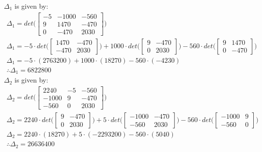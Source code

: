 \documentclass[letterpaper]{article}
\begin{document}
$\Delta_1$ is given by:
    \begin{gather*}
        \Delta_1 = det\Bigg(
        \begin{bmatrix}
            -5 & -1000 & -560\\
            9 & 1470 & -470\\
            0 & -470 & 2030
        \end{bmatrix}
        \Bigg)\\
        \Delta_1 = -5\cdot det\bigg(
        \begin{bmatrix}
            1470 & -470\\
            -470 & 2030
        \end{bmatrix}
        \bigg)
        +1000\cdot det\bigg(
        \begin{bmatrix}
            9 & -470\\
            0 & 2030
        \end{bmatrix}
        \bigg)
        -560\cdot det\bigg(
        \begin{bmatrix}
            9 & 1470\\
            0 & -470
        \end{bmatrix}
        \bigg)\\
        \Delta_1 = -5\cdot(2763200)+1000\cdot(18270)-560\cdot(-4230)\\
        \therefore\Delta_1 = 6822800
    \end{gather*}
$\Delta_2$ is given by:
    \begin{gather*}
        \Delta_2 = det\Bigg(
        \begin{bmatrix}
            2240 & -5 & -560\\
            -1000 & 9 & -470\\
            -560 & 0 & 2030
        \end{bmatrix}
        \Bigg)\\
        \Delta_2 = 2240\cdot det\bigg(
        \begin{bmatrix}
            9 & -470\\
            0 & 2030
        \end{bmatrix}
        \bigg)
        +5\cdot det\bigg(
        \begin{bmatrix}
            -1000 & -470\\
            -560 & 2030
        \end{bmatrix}
        \bigg)
        -560\cdot det\bigg(
        \begin{bmatrix}
            -1000 & 9\\
            -560 & 0
        \end{bmatrix}
        \bigg)\\
        \Delta_2 = 2240\cdot(18270)+5\cdot(-2293200)-560\cdot(5040)\\
        \therefore\Delta_2 = 26636400
    \end{gather*}
\end{document}
